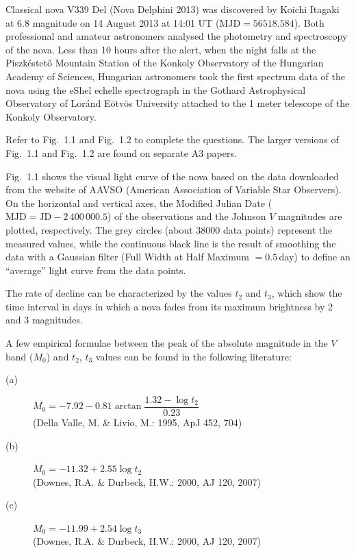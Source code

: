 Classical nova V339 Del (Nova Delphini 2013) was discovered by Koichi Itagaki
at 6.8 magnitude on 14 August 2013 at 14:01 UT ($\mathrm{MJD} = 56518.584$).
Both professional and amateur astronomers analysed the photometry and
spectroscopy of the nova. Less than 10 hours after the alert, when the night
falls at the Piszk\'estet\H{o} Mountain Station of the Konkoly Observatory of
the Hungarian Academy of Sciences, Hungarian astronomers took the first
spectrum data of the nova using the eShel echelle spectrograph in the Gothard
Astrophysical Observatory of Lor\'and E\"otv\"os University attached to the
1 meter telescope of the Konkoly Observatory.

Refer to Fig.~1.1 and Fig.~1.2 to complete the questions. The larger versions
of Fig.~1.1 and Fig.~1.2 are found on separate A3 papers.

Fig.~1.1 shows the visual light curve of the nova based on the data
downloaded from the website of AAVSO (American Association of Variable Star
Observers). On the horizontal and vertical axes, the Modified Julian Date
($\mathrm{MJD} = \mathrm{JD} - 2\,400\,000.5$) of the observations and the
Johnson $V$ magnitudes are plotted, respectively. The grey circles (about
38000 data points) represent the measured values, while the continuous black
line is the result of smoothing the data with a Gaussian filter (Full Width
at Half Maximum $= 0.5$\,day) to define an ``average'' light curve from the
data points.

The rate of decline can be characterized by the values $t_2$ and $t_3$, which
show the time interval in days in which a nova fades from its maximum
brightness by 2 and 3 magnitudes.

A few empirical formulae between the peak of the absolute magnitude in the
$V$ band ($M_0$) and $t_2$, $t_3$ values can be found in the following
literature:
\begin{description}
\item[(a)] $M_0 = -7.92 - 0.81\arctan\dfrac{1.32 - \log t_2}{0.23}$ \\
  (Della Valle, M. \& Livio, M.: 1995, ApJ 452, 704)
\item[(b)] $M_0 = -11.32 + 2.55\log t_2$ \\
  (Downes, R.A. \& Durbeck, H.W.: 2000, AJ 120, 2007)
\item[(c)] $M_0 = -11.99 + 2.54\log t_3$ \\
  (Downes, R.A. \& Durbeck, H.W.: 2000, AJ 120, 2007)
\end{description}


